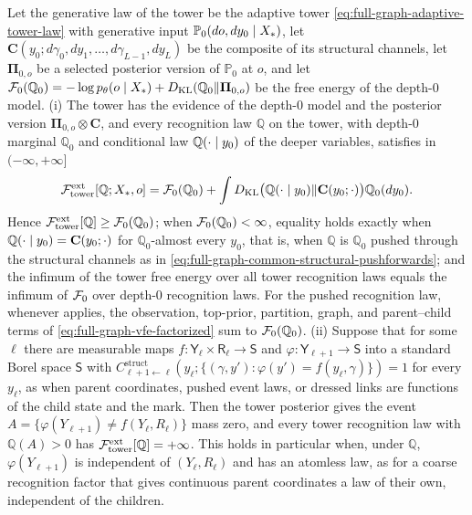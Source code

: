 Let the generative law of the tower be the adaptive tower
\eqref{eq:full-graph-adaptive-tower-law} with generative input $\mathbb P_0(do,dy_0\mid X_*)$,
let $\mathbf C(y_0;d\gamma_0,dy_1,\ldots,d\gamma_{L-1},dy_L)$ be the composite of its structural
channels, let $\boldsymbol\Pi_{0,o}$ be a selected posterior version of $\mathbb P_0$ at $o$, and
let $\mathcal F_0(\mathbb Q_0)=-\log p_\theta(o\mid X_*)+D_{\mathrm{KL}}(\mathbb Q_0\Vert\boldsymbol\Pi_{0,o})$
be the free energy of the depth-$0$ model. (i) The tower has the evidence of the depth-$0$
model and the posterior version $\boldsymbol\Pi_{0,o}\otimes\mathbf C$, and every recognition
law $\mathbb Q$ on the tower, with depth-$0$ marginal $\mathbb Q_0$ and conditional law
$\mathbb Q(\cdot\mid y_0)$ of the deeper variables, satisfies in $(-\infty,+\infty]$
\begin{equation}
\mathcal F^{\mathrm{ext}}_{\mathrm{tower}}[\mathbb Q;X_*,o]
=\mathcal F_0(\mathbb Q_0)
+\int D_{\mathrm{KL}}\bigl(\mathbb Q(\cdot\mid y_0)\Vert\mathbf C(y_0;\cdot)\bigr)\mathbb Q_0(dy_0).
\label{eq:full-graph-adaptive-tower-vfe}
\end{equation}
Hence $\mathcal F^{\mathrm{ext}}_{\mathrm{tower}}[\mathbb Q]\ge\mathcal F_0(\mathbb Q_0)$; when
$\mathcal F_0(\mathbb Q_0)<\infty$, equality holds exactly when
$\mathbb Q(\cdot\mid y_0)=\mathbf C(y_0;\cdot)$ for $\mathbb Q_0$-almost every $y_0$, that is,
when $\mathbb Q$ is $\mathbb Q_0$ pushed through the structural channels as in
\eqref{eq:full-graph-common-structural-pushforwards}; and the infimum of the tower free energy
over all tower recognition laws equals the infimum of $\mathcal F_0$ over depth-$0$ recognition
laws. For the pushed recognition law, whenever  applies,
the observation, top-prior, partition, graph, and parent--child terms of
\eqref{eq:full-graph-vfe-factorized} sum to $\mathcal F_0(\mathbb Q_0)$. (ii) Suppose that for
some $\ell$ there are measurable maps $f:\mathsf Y_\ell\times\mathsf R_\ell\to\mathsf S$ and
$\varphi:\mathsf Y_{\ell+1}\to\mathsf S$ into a standard Borel space $\mathsf S$ with
$C^{\mathrm{struct}}_{\ell+1\leftarrow\ell}(y_\ell;\{(\gamma,y'):\varphi(y')=f(y_\ell,\gamma)\})=1$
for every $y_\ell$, as when parent coordinates, pushed event laws, or dressed links are
functions of the child state and the mark. Then the tower posterior gives the event
$A=\{\varphi(Y_{\ell+1})\ne f(Y_\ell,R_\ell)\}$ mass zero, and every tower recognition law with
$\mathbb Q(A)>0$ has $\mathcal F^{\mathrm{ext}}_{\mathrm{tower}}[\mathbb Q]=+\infty$. This holds in
particular when, under $\mathbb Q$, $\varphi(Y_{\ell+1})$ is independent of $(Y_\ell,R_\ell)$ and
has an atomless law, as for a coarse recognition factor that gives continuous parent
coordinates a law of their own, independent of the children. 

